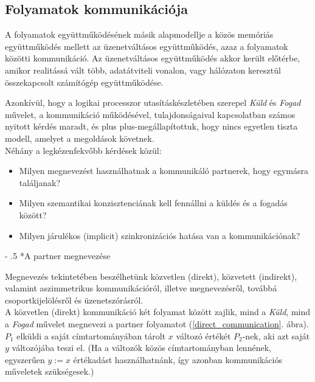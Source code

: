 \documentclass[tikz,12pt,margin=0px]{article}
\makeatletter
\renewcommand\paragraph{%
	\@startsection{paragraph}{4}{0mm}%
	{-\baselineskip}%
	{.5\baselineskip}%
	{\normalfont\normalsize\bfseries}}
\newcommand\lword[1]{\leavevmode\nobreak\hskip0pt plus\linewidth\penalty50\hskip0pt plus-\linewidth\nobreak #1}
\makeatother
\begin{document}
    \subsection*{Folyamatok kommunikációja}

    A folyamatok együttműködésének másik alapmodellje a közös memóriás együttműködés mellett az üzenetváltásos együttműködés, azaz a folyamatok közötti kommunikáció. Az üzenetváltásos együttműködés akkor került előtérbe, amikor realitássá vált több, adatátviteli vonalon, vagy hálózaton keresztül összekapcsolt számítógép együttműködése.

    \noindent Azonkívül, hogy a logikai processzor utasításkészletében szerepel \emph{Küld} és \emph{Fogad} művelet, a kommunikáció működésével, tulajdonságaival kapcsolatban számos nyitott kérdés maradt, és \lword{megállapítottuk}, hogy nincs egyetlen tiszta modell, amelyet a megoldások követnek.\\

    \noindent Néhány a legkézenfekvőbb kérdések közül:
    \begin{itemize}[topsep=8pt,itemsep=4pt,partopsep=4pt, parsep=4pt]
        \item Milyen megnevezést használhatnak a kommunikáló partnerek, hogy egymásra találjanak?
        \item Milyen szemantikai konzisztenciának kell fennállni a küldés és a fogadás között?
        \item Milyen járulékos (implicit) szinkronizációs hatása van a kommunikációnak?
    \end{itemize}

    \paragraph*{A partner megnevezése}

    Megnevezés tekintetében beszélhetünk közvetlen (direkt), közvetett (indirekt), valamint aszimmetrikus kommunikációról, illetve megnevezésről, továbbá csoportkijelölésről és üzenetszórásról.\\

    \noindent A közvetlen (direkt) kommunikáció két folyamat között zajlik, mind a \emph{Küld}, mind a \emph{Fogad} művelet megnevezi a partner folyamatot (\ref{direct_communication}. ábra). $P_1$ elküldi a saját címtartományában tárolt $x$ változó értékét $P_2$-nek, aki azt saját $y$ változójába teszi el. (Ha a változók közös címtartományban lennének, egyszerűen $y:=x$ értékadást használhatnánk, így azonban kommunikációs műveletek szükségesek.)
\end{document}
